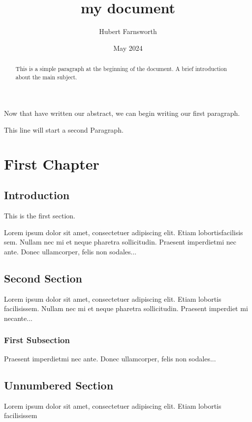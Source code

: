 \documentclass[12pt, a4paper, twoside]{article}
\title{my document}
\author{Hubert Farnsworth}
\date{May 2024}
\begin{document}
\begin{abstract}
This is a simple paragraph at the beginning of the document. A brief introduction about the main subject.
\end{abstract}

Now that have written our abstract, we can begin writing our first paragraph.


This line will start a second Paragraph.

\chapter{First Chapter}

\section{Introduction}

This is the first section.

Lorem  ipsum  dolor  sit  amet,  consectetuer  adipiscing  
elit.   Etiam  lobortisfacilisis sem.  Nullam nec mi et 
neque pharetra sollicitudin.  Praesent imperdietmi nec ante. 
Donec ullamcorper, felis non sodales...

\section{Second Section}

Lorem ipsum dolor sit amet, consectetuer adipiscing elit.
Etiam lobortis facilisissem.  Nullam nec mi et neque pharetra
sollicitudin.  Praesent imperdiet mi necante...

\subsection{First Subsection}
Praesent imperdietmi nec ante. Donec ullamcorper, felis non sodales...

\section*{Unnumbered Section}
Lorem ipsum dolor sit amet, consectetuer adipiscing elit.
Etiam lobortis facilisissem
\end{document}
